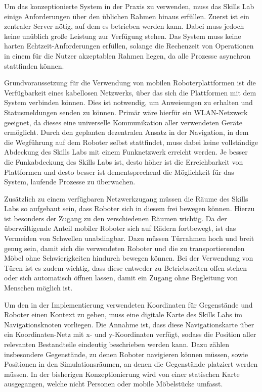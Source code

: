 Um das konzeptionierte System in der Praxis zu verwenden, muss das Skills Lab einige Anforderungen über den üblichen Rahmen hinaus erfüllen. Zuerst ist ein zentraler Server nötig, auf dem es betrieben werden kann. Dabei muss jedoch keine unüblich große Leistung zur Verfügung stehen. Das System muss keine harten Echtzeit-Anforderungen erfüllen, solange die Rechenzeit von Operationen in einem für die Nutzer akzeptablen Rahmen liegen, da alle Prozesse asynchron stattfinden können.

Grundvoraussetzung für die Verwendung von mobilen Roboterplattformen ist die Verfügbarkeit eines kabellosen Netzwerks, über das sich die Plattformen mit dem System verbinden können. Dies ist notwendig, um Anweisungen zu erhalten und Statusmeldungen senden zu können. Primär wäre hierfür ein WLAN-Netzwerk geeignet, da dieses eine universelle Kommunikation aller verwendeten Geräte ermöglicht. Durch den geplanten dezentralen Ansatz in der Navigation, in dem die Wegführung auf dem Roboter selbst stattfindet, muss dabei keine vollständige Abdeckung des Skills Labs mit einem Funknetzwerk erreicht werden. Je besser die Funkabdeckung des Skills Labs ist, desto höher ist die Erreichbarkeit von Plattformen und desto besser ist dementsprechend die Möglichkeit für das System, laufende Prozesse zu überwachen.

Zusätzlich zu einem verfügbaren Netzwerkzugang müssen die Räume des Skills Labs so aufgebaut sein, dass Roboter sich in diesem frei bewegen können. Hierzu ist besonders der Zugang zu den verschiedenen Räumen wichtig. Da der überwältigende Anteil mobiler Roboter sich auf Rädern fortbewegt, ist das Vermeiden von Schwellen unabdingbar. Dazu müssen Türrahmen hoch und breit genug sein, damit sich die verwendeten Roboter und die zu transportierenden Möbel ohne Schwierigkeiten hindurch bewegen können. Bei der Verwendung von Türen ist es zudem wichtig, dass diese entweder zu Betriebszeiten offen stehen oder sich automatisch öffnen lassen, damit ein Zugang ohne Begleitung von Menschen möglich ist.

Um den in der Implementierung verwendeten Koordinaten für Gegenstände und Roboter einen Kontext zu geben, muss eine digitale Karte des Skills Labs im Navigationsknoten vorliegen. Die Annahme ist, dass diese Navigationskarte über ein Koordinaten-Netz mit x- und y-Koordinaten verfügt, sodass die Position aller relevanten Bestandteile eindeutig beschrieben werden kann. Dazu zählen insbesondere Gegenstände, zu denen Roboter navigieren können müssen, sowie Positionen in den Simulationsräumen, an denen die Gegenstände platziert werden müssen. In der bisherigen Konzeptionierung wird von einer statischen Karte ausgegangen, welche nicht Personen oder mobile Möbelstücke umfasst.


